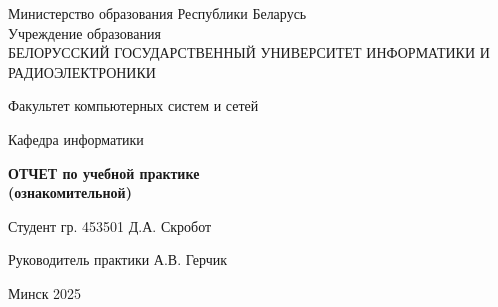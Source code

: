 \newpage
\thispagestyle{empty}

\begin{center}
    Министерство образования Республики Беларусь \\
    \vspace{\baselineskip}
    Учреждение образования \\
    БЕЛОРУССКИЙ ГОСУДАРСТВЕННЫЙ УНИВЕРСИТЕТ ИНФОРМАТИКИ И РАДИОЭЛЕКТРОНИКИ
\end{center}

\vspace{\baselineskip}

\noindent Факультет компьютерных систем и сетей

\vspace{\baselineskip}

\noindent Кафедра информатики

\vfill

\begin{center}
    \textbf{
        ОТЧЕТ по учебной практике \\
        (ознакомительной)
    }
\end{center}

\vfill

\noindent Студент гр. 453501 \hfill Д.А. Скробот

\vspace{\baselineskip}

\noindent Руководитель практики \hfill А.В. Герчик

\vfill

\begin{center}
    Минск 2025
\end{center}